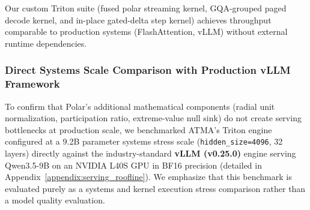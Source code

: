 \documentclass{article} %
\begin{document}
Our custom Triton suite (fused polar streaming kernel, GQA-grouped paged decode kernel, and in-place gated-delta step kernel) achieves throughput comparable to production systems (FlashAttention, vLLM) without external runtime dependencies.

\begin{table}[t]
\centering
\small
\setlength{\tabcolsep}{4.4pt}
\caption{Short-context quality and systems trade-offs. Base mean is the unweighted mean of eight likelihood-scored tasks. Serving uses one sequence and one timing sample on the same L40S; latency is derived from the logged throughput. MFU is the final 10B training value at sequence length 2K. Bold is best within each comparison group.}
\label{table:quality_efficiency}
\end{table}

\subsubsection{Direct Systems Scale Comparison with Production vLLM Framework}
To confirm that Polar's additional mathematical components (radial unit normalization, participation ratio, extreme-value null sink) do not create serving bottlenecks at production scale, we benchmarked ATMA's Triton engine configured at a 9.2B parameter systems stress scale (\texttt{hidden\_size=4096}, 32 layers) directly against the industry-standard \textbf{vLLM (v0.25.0)} engine serving Qwen3.5-9B on an NVIDIA L40S GPU in BF16 precision (detailed in Appendix~\ref{appendix:serving_roofline}). We emphasize that this benchmark is evaluated purely as a systems and kernel execution stress comparison rather than a model quality evaluation.
\end{document}
